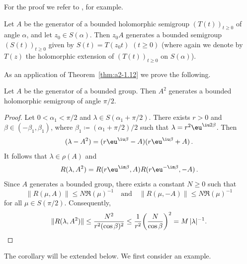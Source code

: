 For the proof we refer to \textcite{davies:1980}, for example.
\begin{remark*}\label{rem:a2-1.6-kgk}
Let $A$ be the generator of a bounded holomorphic semigroup $(T(t))_{t \geq 0}$ 
of angle $\alpha$, and let $z_{0} \in S(\alpha)$.
Then $z_{0}A$ generates a bounded semigroup 
$(S(t))_{t \geq 0}$ given by $S(t) = T(z_{0}t)$  $(t \geq 0)$ (where again we denote by $T(z)$ the holomorphic extension of\/ $(T(t))_{t \geq 0}$ on $S(\alpha)$).
\end{remark*}
As an application of Theorem~\ref{thm:a2-1.12}  we prove the following.
\begin{corollary}\label{cor:a2-1.13}
Let $A$ be the generator of a bounded group.
Then $A^{2}$ generates a bounded holomorphic semigroup of angle $\pi/2$.
\end{corollary}
\begin{proof}
Let $0 < \alpha_{1} < \pi/2$ and $\lambda \in S(\alpha_{1} + \pi/2)$.
There exists $r > 0$ and $\beta \in (-\beta_{1},\beta_{1})$,
where $\beta_{1} \coloneqq (\alpha_{1} + \pi/2)/2$
such that $\lambda = r^{2}\eu^{\iu 2\beta}$.
Then 
\[
(\lambda - A^{2}) = (r\eu^{\iu\beta} - A)(r\eu^{\iu\beta} + A) \, .
\] 
It follows that $\lambda \in \rho(A)$ and 
\begin{equation}\label{eq:a2-1.7}
    R(\lambda,A^{2}) = R(r\eu^{\im\beta},A)R(r\eu^{-\im\beta},-A) \, .
\end{equation}
Since $A$ generates a bounded group, there exists a constant $N \geq 0$ such that 
%
\[
	\|R(\mu,A)\| \leq N\Re(\mu)^{-1} \quad \text{and} \quad \|R(\mu,-A)\| \leq N \Re(\mu)^{-1} 
\]
%
for all $\mu \in S(\pi/2)$.
Consequently, 
%
\[
	\|R(\lambda,A^{2})\| \leq \frac{N^{2}}{r^{2} (\cos\beta)^{2}} 
		\leq \frac{1}{r^{2}}\mleft( \frac{N}{\cos\beta} \mright)^{2} = M\,|\lambda|^{-1} .
\qedhere
\]
%
\end{proof}
The corollary will be extended below.
We first consider an example.
